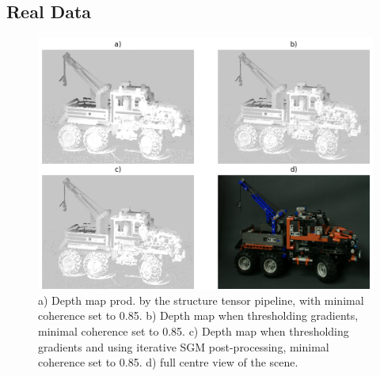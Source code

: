 \documentclass  [
  paper    = a4,
  BCOR     = 10mm,
  twoside,
  fontsize = 12pt,
  fleqn,
  toc      = bibnumbered,
  toc      = listofnumbered,
  numbers  = noendperiod,
  headings = normal,
  listof   = leveldown,
  version  = 3.03
]                                       {scrreprt}
\begin{document}
\begin{appendix}
\chapter{Real Data}
\label{sec:realdata_appendix}
\begin{figure}
	\centering
	\includegraphics[width=1\linewidth]{images/truck_realdata}
	\caption[Truck with iterative SGM]{a) Depth map prod. by the structure tensor pipeline, with minimal coherence set to 0.85. b) Depth map when thresholding gradients, minimal coherence set to 0.85. c) Depth map when thresholding gradients and using iterative SGM post-processing, minimal coherence set to 0.85.  d) full centre view of the scene.}
	\label{fig:truckrealdata}
\end{figure}

\end{appendix}
\end{document}
